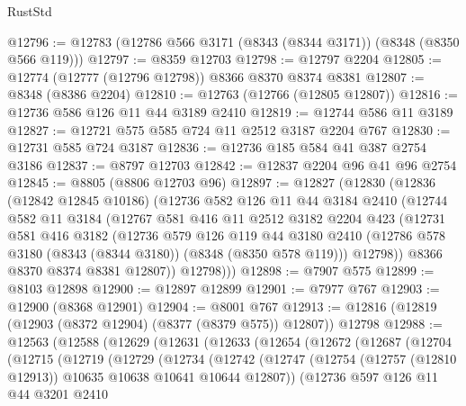 \begin{lexlean}{RustStd}
\begin{coremodule}
{\begin{coremodule}
{{{{{{{{{{{{{{{{{{{{{{{{{{{{{{{{{{{{{{{{{{{{{{{{{{@12796 := @12783 (@12786 @566 @3171 (@8343 (@8344 @3171)) (@8348 (@8350 @566 @119)))
@12797 := @8359 @12703
@12798 := @12797 @2204
@12805 := @12774 (@12777 (@12796 @12798)) @8366 @8370 @8374 @8381
@12807 := @8348 (@8386 @2204)
@12810 := @12763 (@12766 (@12805 @12807))
@12816 := @12736 @586 @126 @11 @44 @3189 @2410
@12819 := @12744 @586 @11 @3189
@12827 := @12721 @575 @585 @724 @11 @2512 @3187 @2204 @767
@12830 := @12731 @585 @724 @3187
@12836 := @12736 @185 @584 @41 @387 @2754 @3186
@12837 := @8797 @12703
@12842 := @12837 @2204 @96 @41 @96 @2754
@12845 := @8805 (@8806 @12703 @96)
@12897 := @12827
    (@12830
      (@12836
        (@12842 @12845 @10186)
        (@12736
          @582
          @126
          @11
          @44
          @3184
          @2410
          (@12744
            @582
            @11
            @3184
            (@12767
              @581
              @416
              @11
              @2512
              @3182
              @2204
              @423
              (@12731
                @581
                @416
                @3182
                (@12736
                  @579
                  @126
                  @119
                  @44
                  @3180
                  @2410
                  (@12786 @578 @3180 (@8343 (@8344 @3180)) (@8348 (@8350 @578 @119)))
                  @12798))
              @8366
              @8370
              @8374
              @8381
              @12807))
          @12798)))
@12898 := @7907 @575
@12899 := @8103 @12898
@12900 := @12897 @12899
@12901 := @7977 @767
@12903 := @12900 (@8368 @12901)
@12904 := @8001 @767
@12913 := @12816 (@12819 (@12903 (@8372 @12904) (@8377 (@8379 @575)) @12807)) @12798
@12988 := @12563
    (@12588
      (@12629
        (@12631
          (@12633
            (@12654
              (@12672
                (@12687
                  (@12704
                    (@12715
                      (@12719
                        (@12729
                          (@12734
                            (@12742
                              (@12747
                                (@12754
                                  (@12757 (@12810 @12913))
                                  @10635
                                  @10638
                                  @10641
                                  @10644
                                  @12807))
                              (@12736
                                @597
                                @126
                                @11
                                @44
                                @3201
                                @2410
}}}}}}}}}}}}}}}}}}}}}}}}}}}}}}}}}}}}}}}}}}}}}}}}}}
\end{coremodule}}
\end{coremodule}
\end{lexlean}
